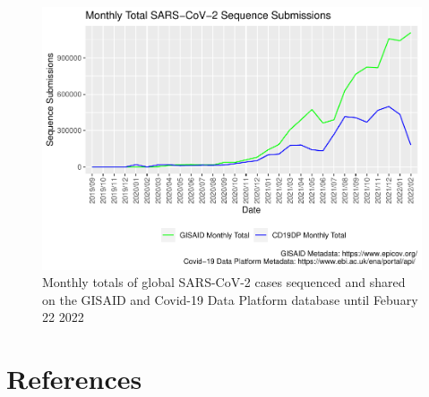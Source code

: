 \documentclass{article}
\begin{document}
\begin{figure}
\centering
\includegraphics{Report_files/figure-latex/fig2-1.pdf}
\caption{Monthly totals of global SARS-CoV-2 cases sequenced and shared
on the GISAID and Covid-19 Data Platform database until Febuary 22 2022}
\end{figure}

\hypertarget{references}{%
\section*{References}\label{references}}
\end{document}
